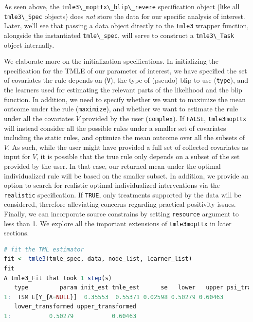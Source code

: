 \documentclass[
  12pt, krantz2,
]{krantz}
\newcommand{\passthrough}[1]{#1}
\theoremstyle{definition}
\theoremstyle{definition}
\theoremstyle{definition}
\newcommand{\1}{\mathbbm{1}}
\begin{document}
As seen above, the \passthrough{\lstinline!tmle3\_mopttx\_blip\_revere!} specification object
(like all \passthrough{\lstinline!tmle3\_Spec!} objects) does \emph{not} store the data for our
specific analysis of interest. Later,
we'll see that passing a data object directly to the \passthrough{\lstinline!tmle3!} wrapper function,
alongside the instantiated \passthrough{\lstinline!tmle\_spec!}, will serve to construct a \passthrough{\lstinline!tmle3\_Task!}
object internally.

We elaborate more on the initialization specifications. In initializing the
specification for the TMLE of our parameter of interest, we have specified the
set of covariates the rule depends on (\passthrough{\lstinline!V!}), the type of (pseudo) blip to use
(\passthrough{\lstinline!type!}), and the learners used for estimating the relevant parts of the
likelihood and the blip function. In addition, we need to specify whether we
want to maximize the mean outcome under the rule (\passthrough{\lstinline!maximize!}), and whether we
want to estimate the rule under all the covariates \(V\) provided by the user
(\passthrough{\lstinline!complex!}). If \passthrough{\lstinline!FALSE!}, \passthrough{\lstinline!tmle3mopttx!} will instead consider all the possible
rules under a smaller set of covariates including the static rules, and optimize
the mean outcome over all the subsets of \(V\). As such, while the user might have
provided a full set of collected covariates as input for \(V\), it is possible
that the true rule only depends on a subset of the set provided by the user. In
that case, our returned mean under the optimal individualized rule will be based
on the smaller subset. In addition, we provide an option to search for realistic
optimal individualized interventions via the \passthrough{\lstinline!realistic!} specification. If
\passthrough{\lstinline!TRUE!}, only treatments supported by the data will be considered, therefore
alleviating concerns regarding practical positivity issues. Finally, we can incorporate
source constrains by setting \passthrough{\lstinline!resource!} argument to less than 1. We explore all the
important extensions of \passthrough{\lstinline!tmle3mopttx!} in later sections.

\begin{lstlisting}[language=R]
# fit the TML estimator
fit <- tmle3(tmle_spec, data, node_list, learner_list)
fit
A tmle3_Fit that took 1 step(s)
   type         param init_est tmle_est      se   lower   upper psi_transformed
1:  TSM E[Y_{A=NULL}]  0.35553  0.55371 0.02598 0.50279 0.60463         0.55371
   lower_transformed upper_transformed
1:           0.50279           0.60463
\end{lstlisting}
\end{document}
